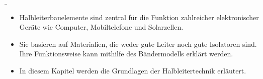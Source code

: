\begin{frame}
\b{
\begin{itemize}
    \item Halbleiterbauelemente sind zentral für die Funktion zahlreicher elektronischer Geräte wie Computer, Mobiltelefone und Solarzellen.
    \item Sie basieren auf Materialien, die weder gute Leiter noch gute Isolatoren sind. Ihre Funktionsweise kann mithilfe des Bändermodells erklärt werden.
    \item In diesem Kapitel werden die Grundlagen der Halbleitertechnik erläutert.
\end{itemize}}
\end{frame}

